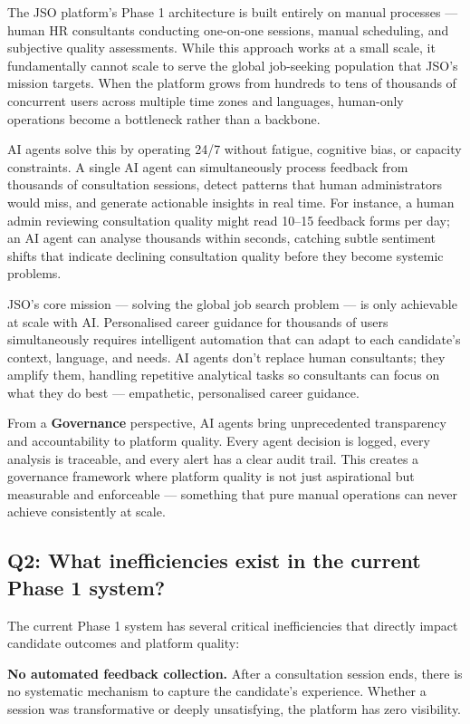 \documentclass[11pt, a4paper]{article}
\begin{document}
The JSO platform's Phase 1 architecture is built entirely on manual processes — human HR consultants conducting one-on-one sessions, manual scheduling, and subjective quality assessments. While this approach works at a small scale, it fundamentally cannot scale to serve the global job-seeking population that JSO's mission targets. When the platform grows from hundreds to tens of thousands of concurrent users across multiple time zones and languages, human-only operations become a bottleneck rather than a backbone.

AI agents solve this by operating 24/7 without fatigue, cognitive bias, or capacity constraints. A single AI agent can simultaneously process feedback from thousands of consultation sessions, detect patterns that human administrators would miss, and generate actionable insights in real time. For instance, a human admin reviewing consultation quality might read 10--15 feedback forms per day; an AI agent can analyse thousands within seconds, catching subtle sentiment shifts that indicate declining consultation quality before they become systemic problems.

JSO's core mission — solving the global job search problem — is only achievable at scale with AI. Personalised career guidance for thousands of users simultaneously requires intelligent automation that can adapt to each candidate's context, language, and needs. AI agents don't replace human consultants; they amplify them, handling repetitive analytical tasks so consultants can focus on what they do best — empathetic, personalised career guidance.

From a \textbf{Governance} perspective, AI agents bring unprecedented transparency and accountability to platform quality. Every agent decision is logged, every analysis is traceable, and every alert has a clear audit trail. This creates a governance framework where platform quality is not just aspirational but measurable and enforceable — something that pure manual operations can never achieve consistently at scale.

\subsection{Q2: What inefficiencies exist in the current Phase 1 system?}

The current Phase 1 system has several critical inefficiencies that directly impact candidate outcomes and platform quality:

\textbf{No automated feedback collection.} After a consultation session ends, there is no systematic mechanism to capture the candidate's experience. Whether a session was transformative or deeply unsatisfying, the platform has zero visibility.
\end{document}
